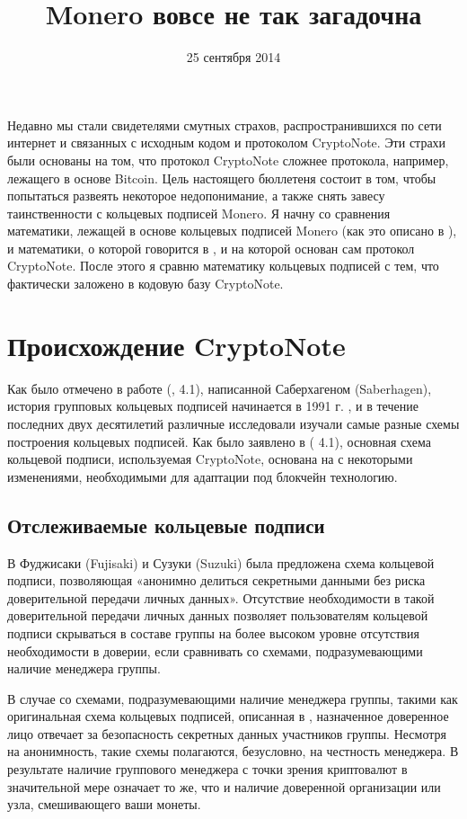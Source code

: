 \documentclass{mrl}
\title{Monero вовсе не так загадочна}
\date{25 сентября 2014}
\numberwithin{equation}{section}
\numberwithin{figure}{section}
\begin{document}
\begin{center}
{}
\end{center}

Недавно мы стали свидетелями смутных страхов, распространившихся по сети интернет и связанных с исходным кодом и протоколом CryptoNote. Эти страхи были основаны на том, что протокол  CryptoNote сложнее протокола, например, лежащего в основе Bitcoin. Цель настоящего бюллетеня состоит в том, чтобы попытаться развеять некоторое недопонимание, а также снять завесу таинственности с кольцевых подписей Monero. Я начну со сравнения математики, лежащей в основе кольцевых подписей Monero (как это описано в \cite{CN}), и математики, о которой говорится в \cite{FS}, и на которой основан сам протокол CryptoNote. После этого я сравню математику кольцевых подписей с тем, что фактически заложено в кодовую базу CryptoNote.

\section{Происхождение CryptoNote}

Как было отмечено в работе (\cite{CN}, 4.1), написанной Саберхагеном (Saberhagen), история групповых кольцевых подписей начинается в 1991 г. \cite{CH}, и в течение последних двух десятилетий различные исследовали изучали самые разные схемы построения кольцевых подписей. Как было заявлено в (\cite{CN} 4.1), основная схема кольцевой подписи, используемая CryptoNote, основана на \cite{FS} с некоторыми изменениями, необходимыми для адаптации под блокчейн технологию.

\subsection{Отслеживаемые кольцевые подписи}

В \cite{FS} Фуджисаки (Fujisaki) и Сузуки (Suzuki) была предложена схема кольцевой подписи, позволяющая «анонимно делиться секретными данными без риска доверительной передачи личных данных». Отсутствие необходимости в такой доверительной передачи личных данных позволяет пользователям кольцевой подписи скрываться в составе группы на более высоком уровне отсутствия необходимости в доверии, если сравнивать со схемами, подразумевающими наличие менеджера группы.

В случае со схемами, подразумевающими наличие менеджера группы, такими как оригинальная схема кольцевых подписей, описанная в \cite{CH}, назначенное доверенное лицо отвечает за безопасность секретных данных участников группы. Несмотря на анонимность, такие схемы полагаются, безусловно, на честность менеджера. В результате наличие группового менеджера с точки зрения криптовалют в значительной мере означает то же, что и наличие доверенной организации или узла, смешивающего ваши монеты.
\end{document}
